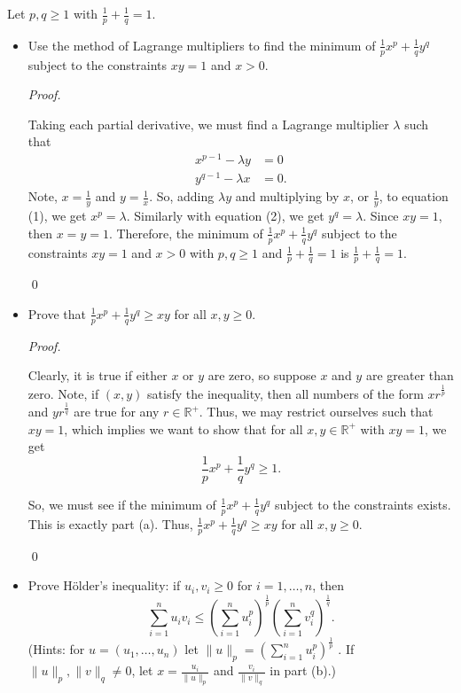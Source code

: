 \documentclass[12pt]{article}
\newenvironment{problem}[2][Problem]{\begin{trivlist}
\item[\hskip \labelsep {\bfseries #1}\hskip \labelsep {\bfseries
#2.}]}{\end{trivlist}}
\newenvironment{sol}
    {\emph{Proof.}
    }
    {
    \qed
    }
\begin{document}
\begin{problem}{25}
  Let $p,q \geq 1$ with $\frac{1}{p} + \frac{1}{q} = 1$. \begin{itemize}
      \item[(a)] Use the method of Lagrange multipliers to find the minimum of $\frac{1}{p}x^p + \frac{1}{q}y^q$ subject to the constraints $xy = 1$ and $x > 0$.
      
      \begin{sol}
      Taking each partial derivative, we must find a Lagrange multiplier $\lambda$ such that \begin{align}
          x^{p-1} - \lambda y &= 0 \\ y^{q-1} - \lambda x &= 0.
      \end{align} Note, $x = \frac{1}{y}$ and $y = \frac{1}{x}$. So, adding $\lambda y$ and multiplying by $x$, or $\frac{1}{y}$, to equation (1), we get $x^p = \lambda$. Similarly with equation (2), we get $y^q = \lambda$. Since $xy = 1$, then $x = y = 1$. Therefore, the minimum of $\frac{1}{p}x^p + \frac{1}{q}y^q$ subject to the constraints $xy = 1$ and $x > 0$ with $p,q \geq 1$ and $\frac{1}{p} + \frac{1}{q} = 1$ is $\frac{1}{p} + \frac{1}{q} = 1$.
      \end{sol}
      
      \item[(b)] Prove that $\frac{1}{p}x^p + \frac{1}{q}y^q \geq xy$ for all $x,y \geq 0$.
      
      \begin{sol}
      Clearly, it is true if either $x$ or $y$ are zero, so suppose $x$ and $y$ are greater than zero. Note, if $(x,y)$ satisfy the inequality, then all numbers of the form $xr^{\frac{1}{p}}$ and $yr^{\frac{1}{q}}$ are true for any $r \in \mathbb{R}^+$. Thus, we may restrict ourselves such that $xy = 1$, which implies we want to show that for all $x,y \in \mathbb{R}^+$ with $xy=1$, we get $$\frac{1}{p}x^p + \frac{1}{q}y^q \geq 1.$$ 
      
      \hspace{1em} So, we must see if the minimum of $\frac{1}{p}x^p + \frac{1}{q}y^q$ subject to the constraints exists. This is exactly part (a). Thus, $\frac{1}{p}x^p + \frac{1}{q}y^q \geq xy$ for all $x,y \geq 0$.
      \end{sol}
      
      \item[(c)] Prove H\"older's inequality: if $u_i, v_i \geq 0$ for $i = 1, \dots, n$, then $$\sum_{i = 1}^nu_iv_i \leq \left( \sum_{i = 1}^n u_i^p \right)^{\frac{1}{p}} \left( \sum_{i = 1}^n v_i^q \right)^{\frac{1}{q}}.$$ (Hints: for $u = (u_1, \dots, u_n)$ let $\lVert u \rVert_p = \left( \sum_{i = 1}^n u_i^p \right)^{\frac{1}{p}}$ . If $\lVert u \rVert_p, \lVert v \rVert_q \neq 0$, let $x = \frac{u_i}{\lVert u \rVert_p}$ and $\frac{v_i}{\lVert v \rVert_q}$ in part (b).)
      

\end{itemize}
\end{problem}
\end{document}
